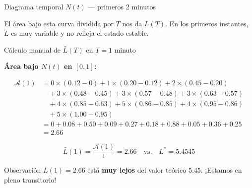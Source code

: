\documentclass[aspectratio=1610, 9pt]{beamer}
\begin{document}
\begin{frame}{Diagrama temporal $N(t)$ --- primeros 2 minutos}

\begin{center}
\end{center}

\vspace{0.1cm}
El área bajo esta curva dividida por $T$ nos da $\bar{L}(T)$. En los primeros instantes, $\bar{L}$ es muy variable y no refleja el estado estable.
\end{frame}

\begin{frame}{Cálculo manual de $\bar{L}(T)$ en $T = 1$ minuto}

\textbf{Área bajo $N(t)$ en $[0, 1]$:}

\vspace{0.2cm}
\small
\begin{align*}
\mathcal{A}(1) &= 0 \times (0.12-0) + 1 \times (0.20-0.12) + 2 \times (0.45-0.20) \\
&\quad + 3 \times (0.48-0.45) + 3 \times (0.57-0.48) + 3 \times (0.63-0.57) \\
&\quad + 4 \times (0.85-0.63) + 5 \times (0.86-0.85) + 4 \times (0.95-0.86) \\
&\quad + 5 \times (1.00-0.95) \\[6pt]
&= 0 + 0.08 + 0.50 + 0.09 + 0.27 + 0.18 + 0.88 + 0.05 + 0.36 + 0.25 \\
&= 2.66
\end{align*}
\normalsize

\[
\bar{L}(1) = \frac{\mathcal{A}(1)}{1} = 2.66 \quad \text{vs.} \quad L^* = 5.4545
\]

\vspace{0.3cm}
\begin{alertblock}{Observación}
$\bar{L}(1) = 2.66$ está \textbf{muy lejos} del valor teórico $5.45$. ¡Estamos en pleno transitorio!
\end{alertblock}
\end{frame}
\end{document}
